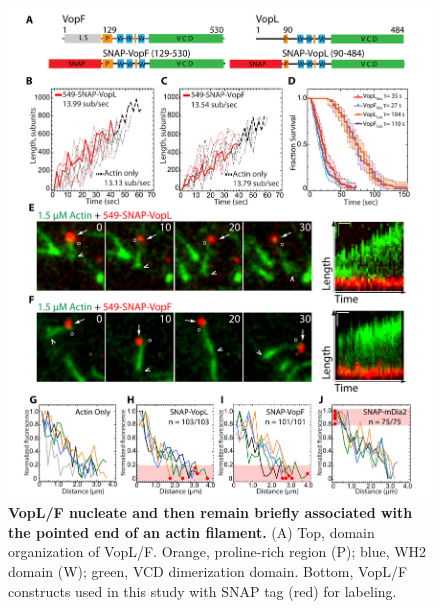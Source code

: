 \begin{figure}
\centering
\includegraphics[width=\textwidth]{img/ch04/Thesis_Vop.pdf}
\caption[ VopL/F nucleate and then remain briefly associated with the pointed end of an actin filament.]{\textbf{ VopL/F nucleate and then remain briefly associated with the pointed end of an actin filament.} (A) Top, domain organization of VopL/F. Orange, proline-rich region (P); blue, WH2 domain (W); green, VCD dimerization domain. Bottom, VopL/F constructs used in this study with SNAP tag (red) for labeling. }
\label{fig:vop}
\end{figure}

